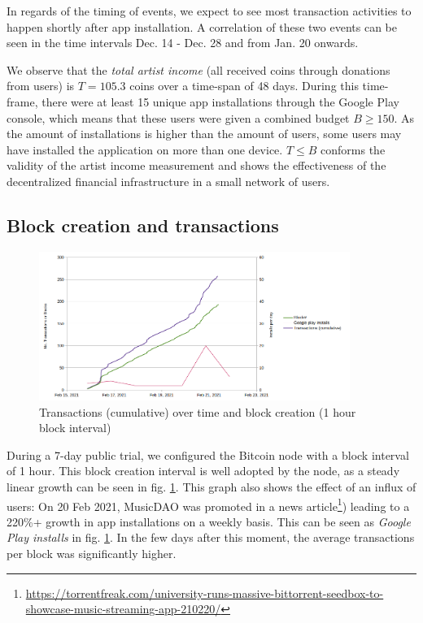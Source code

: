 In regards of the timing of events, we expect to see most transaction activities to happen shortly after app installation. A correlation of these two events can be seen in the time intervals Dec. 14 - Dec. 28 and from Jan. 20 onwards.

We observe that the \textit{total artist income} (all received coins through donations from users) is $T=105.3$ coins over a time-span of 48 days. During this time-frame, there were at least 15 unique app installations through the Google Play console, which means that these users were given a combined budget $B\geq 150$. As the amount of installations is higher than the amount of users, some users may have installed the application on more than one device. $T\leq B$ conforms the validity of the artist income measurement and shows the effectiveness of the decentralized financial infrastructure in a small network of users.

\subsection{Block creation and transactions}
\begin{figure}
    \centering
    \includegraphics[width=0.9\textwidth]{evaluation/transactions-torrentfreak-3.png}
    \caption{Transactions (cumulative) over time and block creation (1 hour block interval)}
    \label{fig:transactions}
\end{figure}
During a 7-day public trial, we configured the Bitcoin node with a block interval of 1 hour. This block creation interval is well adopted by the node, as a steady linear growth can be seen in fig. \ref{fig:transactions}. This graph also shows the effect of an influx of users: On 20 Feb 2021, MusicDAO was promoted in a news article\footnote{\url{https://torrentfreak.com/university-runs-massive-bittorrent-seedbox-to-showcase-music-streaming-app-210220/}}) leading to a 220\%+ growth in app installations on a weekly basis. This can be seen as \textit{Google Play installs} in fig. \ref{fig:transactions}. In the few days after this moment, the average transactions per block was significantly higher.

